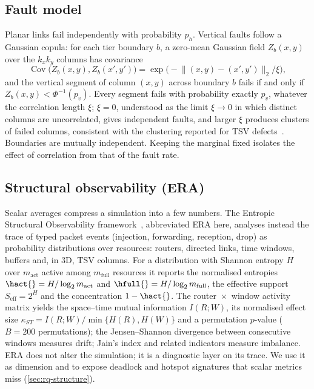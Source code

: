 \subsection{Fault model}
\label{sec:bg-fault}

Planar links fail independently with probability $p_h$. Vertical faults follow a Gaussian copula: for each tier boundary $b$, a zero-mean Gaussian field $Z_b(x,y)$ over the $k_xk_y$ columns has covariance
\begin{equation}\label{eq:copula}
\operatorname{Cov}\bigl(Z_b(x,y),Z_b(x',y')\bigr)=\exp\!\bigl(-\lVert(x,y)-(x',y')\rVert_2/\xi\bigr),
\end{equation}
and the vertical segment of column $(x,y)$ across boundary $b$ fails if and only if $Z_b(x,y)<\Phi^{-1}(p_v)$. Every segment fails with probability exactly $p_v$, whatever the correlation length $\xi$; $\xi=0$, understood as the limit $\xi\to0$ in which distinct columns are uncorrelated, gives independent faults, and larger $\xi$ produces clusters of failed columns, consistent with the clustering reported for TSV defects~\cite{dang2021hotcluster,wang2015clustering}. Boundaries are mutually independent. Keeping the marginal fixed isolates the effect of correlation from that of the fault rate.

\subsection{Structural observability (ERA)}
\label{sec:bg-era}

Scalar averages compress a simulation into a few numbers. The Entropic Structural Observability framework~\cite{mesellem2026era}, abbreviated ERA here, analyses instead the trace of typed packet events (injection, forwarding, reception, drop) as probability distributions over resources: routers, directed links, time windows, buffers and, in 3D, TSV columns. For a distribution with Shannon entropy $H$ over $m_{\mathrm{act}}$ active among $m_{\mathrm{full}}$ resources it reports the normalised entropies $\hact{}=H/\log_2 m_{\mathrm{act}}$ and $\hfull{}=H/\log_2 m_{\mathrm{full}}$, the effective support $S_{\mathrm{eff}}=2^H$ and the concentration $1-\hact{}$. The router~$\times$~window activity matrix yields the space--time mutual information $I(R;W)$, its normalised effect size $\kappa_{ST}=I(R;W)/\min\{H(R),H(W)\}$ and a permutation $p$-value ($B=200$ permutations); the Jensen--Shannon divergence between consecutive windows measures drift; Jain's index and related indicators measure imbalance. ERA does not alter the simulation; it is a diagnostic layer on its trace. We use it as dimension  and to expose deadlock and hotspot signatures that scalar metrics miss (\cref{sec:rq-structure}).
